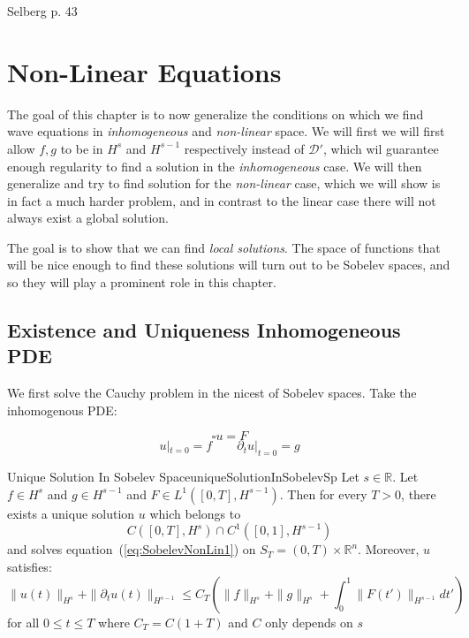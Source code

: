 \documentclass{book}
\newcommand{\R}{{\mathbb{R}}}
\newcommand{\CD}{{\mathcal{D}}}
\begin{document}
Selberg p. 43

\chapter{Non-Linear Equations}\label{cha:nonLinEq}

The goal of this chapter is to now generalize the conditions on which we find wave equations in \emph{inhomogeneous} and
\emph{non-linear} space. We will first we will first allow $f,g$ to be in $H^s$ and $H^{s-1}$ respectively instead of
$\CD'$, which wil guarantee enough regularity to find a solution in the \emph{inhomogeneous} case. We will then
generalize and try to find solution for the \emph{non-linear} case, which we will show is in fact a much harder problem,
and in contrast to the linear case there will not always exist a global solution.

The goal is to show that we can find \emph{local solutions}. The space of functions that will be nice enough to find
these solutions will turn out to be Sobelev spaces, and so they will play a prominent role in this chapter.

\section{Existence and Uniqueness Inhomogeneous PDE}

We first solve the Cauchy problem in the nicest of Sobelev spaces. Take the inhomogenous PDE:

\begin{equation}\label{eq:SobelevNonLin1}
	\square u  =F
\end{equation}
\begin{equation}\label{eq:SobelevNonLin2}
	u|_{t=0} = f \qquad  \partial_t u|_{t=0} = g
\end{equation}

\begin{thm}{Unique Solution In Sobelev Space}{uniqueSolutionInSobelevSp}
	Let $s \in \R$. Let $f \in H^s$ and $g \in H^{s-1}$ and $F \in L^1([0,T], H^{s-1})$. Then for every $T > 0$, there
	exists a unique solution $u$ which belongs to
	\begin{equation}\label{eq:SobelevNonLinSolSp}
	  C([0,T], H^s)\cap C^1([0,1], H^{s-1})
	\end{equation}
	and solves equation~(\ref{eq:SobelevNonLin1}) on $S_T = (0, T)\times \R^n$. Moreover, $u$ satisfies:
	\[
		\|u(t)\|_{H^s} + \|  \partial_t u(t)\|_{H^{s-1}} \le C_T \left( \|f\|_{H^s} + \|g\|_{H^s} + \int_0^1
		\|F(t')\|_{H^{s-1}}dt' \right)
	\]
	for all $0 \le t\le T$ where $C_T = C(1+T)$ and $C$ only depends on $s$
\end{thm}
\end{document}
